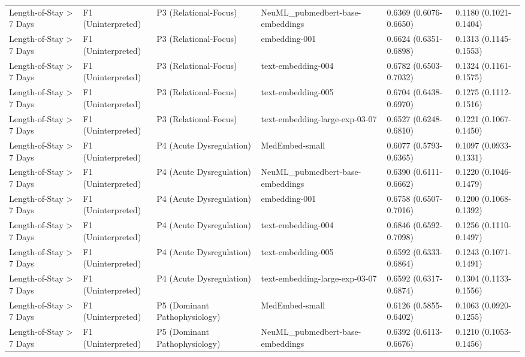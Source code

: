 \documentclass[border=0pt]{standalone}
\begin{document}
\begin{adjustbox}{width=\textwidth}
\begin{tabular}{llllll}
Length-of-Stay \textgreater{} 7 Days & F1 (Uninterpreted) & P3 (Relational-Focus) & NeuML\_pubmedbert-base-embeddings & 0.6369 (0.6076-0.6650) & 0.1180 (0.1021-0.1404) \\
Length-of-Stay \textgreater{} 7 Days & F1 (Uninterpreted) & P3 (Relational-Focus) & embedding-001 & 0.6624 (0.6351-0.6898) & 0.1313 (0.1145-0.1553) \\
Length-of-Stay \textgreater{} 7 Days & F1 (Uninterpreted) & P3 (Relational-Focus) & text-embedding-004 & 0.6782 (0.6503-0.7032) & 0.1324 (0.1161-0.1575) \\
Length-of-Stay \textgreater{} 7 Days & F1 (Uninterpreted) & P3 (Relational-Focus) & text-embedding-005 & 0.6704 (0.6438-0.6970) & 0.1275 (0.1112-0.1516) \\
Length-of-Stay \textgreater{} 7 Days & F1 (Uninterpreted) & P3 (Relational-Focus) & text-embedding-large-exp-03-07 & 0.6527 (0.6248-0.6810) & 0.1221 (0.1067-0.1450) \\
Length-of-Stay \textgreater{} 7 Days & F1 (Uninterpreted) & P4 (Acute Dysregulation) & MedEmbed-small & 0.6077 (0.5793-0.6365) & 0.1097 (0.0933-0.1331) \\
Length-of-Stay \textgreater{} 7 Days & F1 (Uninterpreted) & P4 (Acute Dysregulation) & NeuML\_pubmedbert-base-embeddings & 0.6390 (0.6111-0.6662) & 0.1220 (0.1046-0.1479) \\
Length-of-Stay \textgreater{} 7 Days & F1 (Uninterpreted) & P4 (Acute Dysregulation) & embedding-001 & 0.6758 (0.6507-0.7016) & 0.1200 (0.1068-0.1392) \\
Length-of-Stay \textgreater{} 7 Days & F1 (Uninterpreted) & P4 (Acute Dysregulation) & text-embedding-004 & 0.6846 (0.6592-0.7098) & 0.1256 (0.1110-0.1497) \\
Length-of-Stay \textgreater{} 7 Days & F1 (Uninterpreted) & P4 (Acute Dysregulation) & text-embedding-005 & 0.6592 (0.6333-0.6864) & 0.1243 (0.1071-0.1491) \\
Length-of-Stay \textgreater{} 7 Days & F1 (Uninterpreted) & P4 (Acute Dysregulation) & text-embedding-large-exp-03-07 & 0.6592 (0.6317-0.6874) & 0.1304 (0.1133-0.1556) \\
Length-of-Stay \textgreater{} 7 Days & F1 (Uninterpreted) & P5 (Dominant Pathophysiology) & MedEmbed-small & 0.6126 (0.5855-0.6402) & 0.1063 (0.0920-0.1255) \\
Length-of-Stay \textgreater{} 7 Days & F1 (Uninterpreted) & P5 (Dominant Pathophysiology) & NeuML\_pubmedbert-base-embeddings & 0.6392 (0.6113-0.6676) & 0.1210 (0.1053-0.1456) \\

\end{tabular}
\end{adjustbox}
\end{document}
